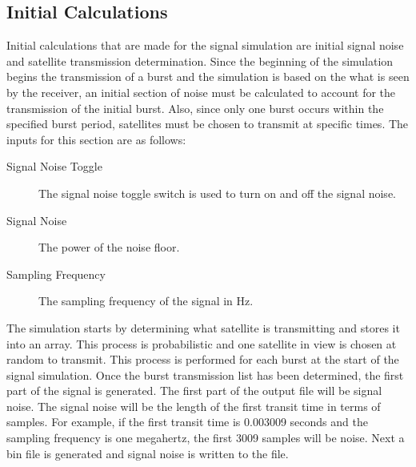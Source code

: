 \documentclass[12pt]{report}
\begin{document}
\subsection{Initial Calculations}
Initial calculations that are made for the signal simulation are initial signal noise and satellite transmission determination. Since the beginning of the simulation begins the transmission of a burst and the simulation is based on the what is seen by the receiver, an initial section of noise must be calculated to account for the transmission of the initial burst. Also, since only one burst occurs within the specified burst period, satellites must be chosen to transmit at specific times. The inputs for this section are as follows:
\begin{description}
    \item[Signal Noise Toggle] The signal noise toggle switch is used to turn on and off the signal noise. 
    \item[Signal Noise] The power of the noise floor.
    \item[Sampling Frequency] The sampling frequency of the signal in Hz.
\end{description}

The simulation starts by determining what satellite is transmitting and stores it into an array. This process is probabilistic and one satellite in view is chosen at random to transmit. This process is performed for each burst at the start of the signal simulation. Once the burst transmission list has been determined, the first part of the signal is generated. The first part of the output file will be signal noise. The signal noise will be the length of the first transit time in terms of samples. For example, if the first transit time is 0.003009 seconds and the sampling frequency is one megahertz, the first 3009 samples will be noise. Next a bin file is generated and signal noise is written to the file. 
\end{document}
